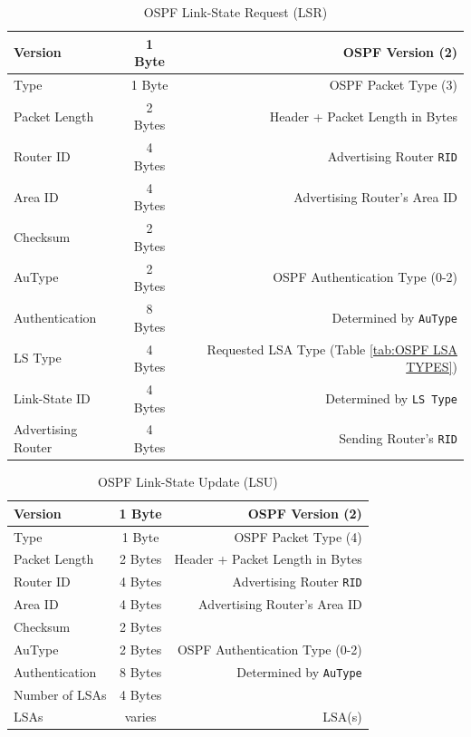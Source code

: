 \documentclass[12pt]{article}
\begin{document}
	\begin{table}[H]
	\centering
	\caption{OSPF Link-State Request (LSR) \label{tab:OSPF LSR}}
	\begin{tabular}{| l | c | r |}
	\hline
	Version			& 1 Byte	& OSPF Version (2)\\\hline
	Type				& 1 Byte	& OSPF Packet Type (3)\\\hline
	Packet Length		& 2 Bytes	& Header + Packet Length in Bytes\\\hline
	Router ID			& 4 Bytes	& Advertising Router \texttt{RID}\\\hline
	Area ID			& 4 Bytes	& Advertising Router's Area ID\\\hline
	Checksum			& 2 Bytes	&\\\hline
	AuType			& 2 Bytes	& OSPF Authentication Type (0-2)\\\hline
	Authentication		& 8 Bytes	& Determined by \texttt{AuType}\\\hline
	LS Type			& 4 Bytes	& Requested LSA Type (Table \ref{tab:OSPF LSA TYPES})\\\hline
	Link-State ID		& 4 Bytes	& Determined by \texttt{LS Type}\\\hline
	Advertising Router	& 4 Bytes	& Sending Router's \texttt{RID}\\\hline
	\end{tabular}\end{table}

	\begin{table}[H]
	\centering
	\caption{OSPF Link-State Update (LSU) \label{tab:OSPF LSU}}
	\begin{tabular}{| l | c | r |}
	\hline
	Version		& 1 Byte	& OSPF Version (2)\\\hline
	Type			& 1 Byte	& OSPF Packet Type (4)\\\hline
	Packet Length	& 2 Bytes	& Header + Packet Length in Bytes\\\hline
	Router ID		& 4 Bytes	& Advertising Router \texttt{RID}\\\hline
	Area ID		& 4 Bytes	& Advertising Router's Area ID\\\hline
	Checksum		& 2 Bytes	&\\\hline
	AuType		& 2 Bytes	& OSPF Authentication Type (0-2)\\\hline
	Authentication	& 8 Bytes	& Determined by \texttt{AuType}\\\hline
	Number of LSAs	& 4 Bytes	&\\\hline
	LSAs			& varies	& LSA(s)\\\hline
	\end{tabular}\end{table}
\end{document}
